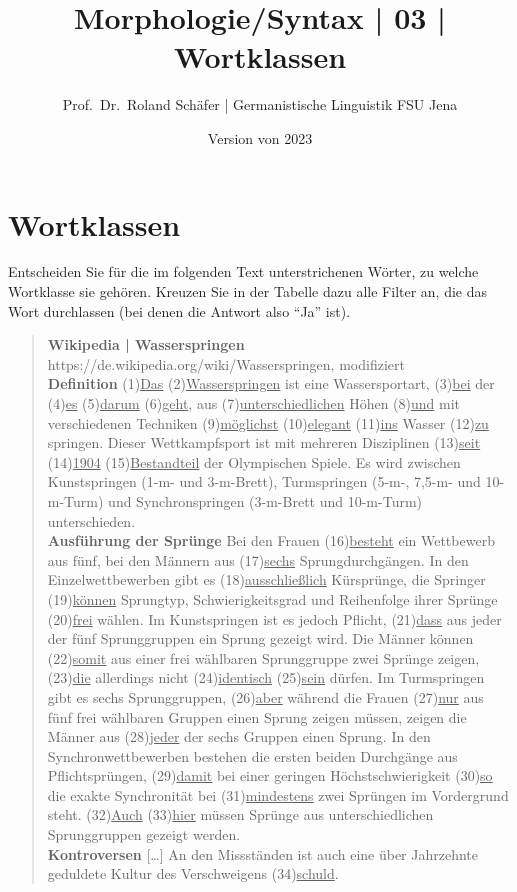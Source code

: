 \documentclass[12pt,a4paper,twoside]{article}
\author{Prof.\ Dr.\ Roland Schäfer | Germanistische Linguistik FSU Jena}
\title{Morphologie\slash Syntax | 03 | Wortklassen}
\date{Version von 2023}
\newenvironment{nohyphens}{%
  \par
  \hyphenpenalty=10000
  \exhyphenpenalty=10000
  \sloppy
}{\par}
\begin{document}
\maketitle

\section{Wortklassen}\label{sec:bestimmen}

Entscheiden Sie für die im folgenden Text unterstrichenen Wörter, zu welche Wortklasse sie gehören.
Kreuzen Sie in der Tabelle dazu alle Filter an, die das Wort durchlassen (bei denen die Antwort also "`Ja"' ist). 

\begin{nohyphens}\begin{quote}
  \textbf{Wikipedia | Wasserspringen}\\
  https://de.wikipedia.org/wiki/Wasserspringen, modifiziert\\[0.5\baselineskip]
  \textbf{Definition}
  (1)\ul{Das} (2)\ul{Wasserspringen} ist eine Wassersportart, (3)\ul{bei} der (4)\ul{es} (5)\ul{darum} (6)\ul{geht}, aus (7)\ul{unterschiedlichen} Höhen (8)\ul{und} mit verschiedenen Techniken (9)\ul{möglichst} (10)\ul{elegant} (11)\ul{ins} Wasser (12)\ul{zu} springen.
  Dieser Wettkampfsport ist mit mehreren Disziplinen (13)\ul{seit} (14)\ul{1904} (15)\ul{Bestandteil} der Olympischen Spiele.
  Es wird zwischen Kunstspringen (1-m- und 3-m-Brett), Turmspringen (5-m-, 7,5-m- und 10-m-Turm) und Synchronspringen (3-m-Brett und 10-m-Turm) unterschieden.\\[0.5\baselineskip]
  \textbf{Ausführung der Sprünge}
  Bei den Frauen (16)\ul{besteht} ein Wettbewerb aus fünf, bei den Männern aus (17)\ul{sechs} Sprungdurchgängen.
  In den Einzelwettbewerben gibt es (18)\ul{ausschließlich} Kürsprünge, die Springer (19)\ul{können} Sprungtyp, Schwierigkeitsgrad und Reihenfolge ihrer Sprünge (20)\ul{frei} wählen.
  Im Kunstspringen ist es jedoch Pflicht, (21)\ul{dass} aus jeder der fünf Sprunggruppen ein Sprung gezeigt wird.
  Die Männer können (22)\ul{somit} aus einer frei wählbaren Sprunggruppe zwei Sprünge zeigen, (23)\ul{die} allerdings nicht (24)\ul{identisch} (25)\ul{sein} dürfen.
  Im Turmspringen gibt es sechs Sprunggruppen, (26)\ul{aber} während die Frauen (27)\ul{nur} aus fünf frei wählbaren Gruppen einen Sprung zeigen müssen, zeigen die Männer aus (28)\ul{jeder} der sechs Gruppen einen Sprung.
  In den Synchronwettbewerben bestehen die ersten beiden Durchgänge aus Pflichtsprüngen, (29)\ul{damit} bei einer geringen Höchstschwierigkeit (30)\ul{so} die exakte Synchronität bei (31)\ul{mindestens} zwei Sprüngen im Vordergrund steht.
  (32)\ul{Auch} (33)\ul{hier} müssen Sprünge aus unterschiedlichen Sprunggruppen gezeigt werden.\\[0.5\baselineskip]
  \textbf{Kontroversen} [\ldots] An den Missständen ist auch eine über Jahrzehnte geduldete Kultur des Verschweigens (34)\ul{schuld}.
\end{quote}\end{nohyphens}
\end{document}
